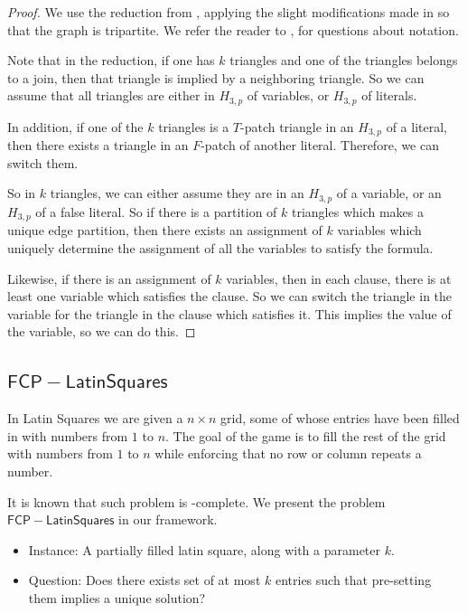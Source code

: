 \documentclass[runningheads,a4paper]{llncs}
\begin{document}
\begin{proof}
We use the reduction from \cite{holyer1981np}, applying the slight modifications made in \cite{colbourn1984complexity} so that the graph is tripartite. We refer the reader to \cite{holyer1981np}, \cite{colbourn1984complexity} for questions about notation.

Note that in the reduction, if one has $k$ triangles and one of the triangles belongs to a join, then that triangle is implied by a neighboring triangle. So we can assume that all triangles are either in $H_{3,p}$ of variables, or $H_{3,p}$ of literals. 

In addition, if one of the $k$ triangles is a $T$-patch triangle in an $H_{3,p}$ of a literal, then there exists a triangle in an $F$-patch of another literal. Therefore, we can switch them.

So in $k$ triangles, we can either assume they are in an $H_{3,p}$ of a variable, or an $H_{3,p}$ of a false literal. So if there is a partition of $k$ triangles which makes a unique edge partition, then there exists an assignment of $k$ variables which uniquely determine the assignment of all the variables to satisfy the formula. 

Likewise, if there is an assignment of $k$ variables, then in each clause, there is at least one variable which satisfies the clause. So we can switch the triangle in the variable for the triangle in the clause which satisfies it. This implies the value of the variable, so we can do this.
\end{proof}

\subsection{$\mathsf{FCP-LatinSquares}$}

In Latin Squares we are given a $n \times n$ grid, some of whose entries have been filled in with numbers from $1$ to $n$. The goal of the game is to fill the rest of the grid with numbers from $1$ to $n$ while enforcing that no row or column repeats a number. 

It is known that such problem is \NP-complete. We present the problem $\mathsf{FCP-Latin Squares}$ in our framework.

\begin{itemize}
\item Instance: A partially filled latin square, along with a parameter $k$. 
\item Question: Does there exists set of at most $k$ entries such that pre-setting them implies a unique solution?
\end{itemize}
\end{document}

